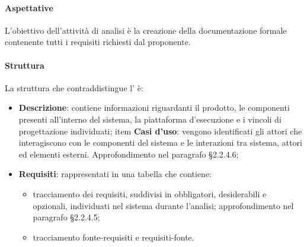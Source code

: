 \paragraph{Aspettative}
L'obiettivo dell'attività di analisi è la creazione della documentazione formale contenente tutti i requisiti richiesti dal proponente.
\paragraph{Struttura}
La struttura che contraddistingue l'\AdR{} è:
\begin{itemize}
	\item \textbf{Descrizione}: contiene informazioni riguardanti il prodotto,  le componenti presenti all'interno del sistema,  la piattaforma d'esecuzione e i vincoli di progettazione individuati;
	item \textbf{Casi d'uso}: vengono identificati gli attori che interagiscono con le componenti del sistema e le interazioni tra sistema,  attori ed elementi esterni.  Approfondimento nel paragrafo §2.2.4.6;
	\item \textbf{Requisiti}: rappresentati in una tabella che contiene:
	\begin{itemize}
 		\item tracciamento dei requisiti,  suddivisi in obbligatori,  desiderabili e opzionali,  individuati nel sistema durante l'analisi; approfondimento nel paragrafo §2.2.4.5;
		\item tracciamento fonte-requisiti e requisiti-fonte. 
	\end{itemize}
\end{itemize}
